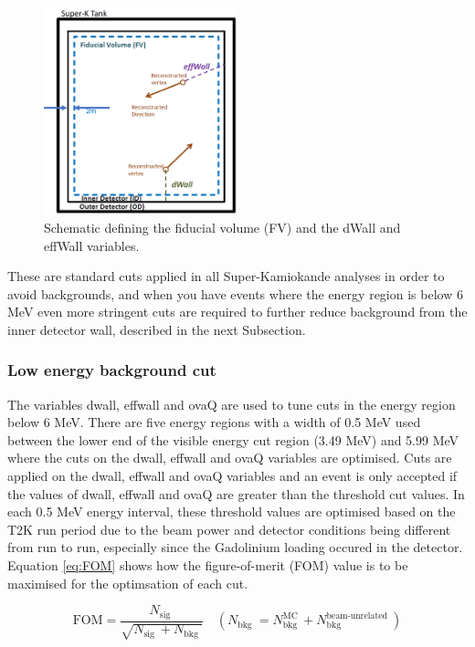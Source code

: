 \begin{figure}
    \centering 
    \includegraphics[width=0.5\textwidth]{Figures/fv_dwall_effwall.png}
    \caption{Schematic defining the fiducial volume (FV) and the dWall and effWall variables.}
    \label{fig:dwall_effwall_fv}
\end{figure} 
                                                                                        
These are standard cuts applied in all Super-Kamiokande analyses in order to avoid backgrounds, and when you have events where the energy region is below 6 MeV even more stringent cuts are required to further reduce background from the inner detector wall, described in the next Subsection. 

\subsubsection{Low energy background cut}

The variables dwall, effwall and ovaQ are used to tune cuts in the energy region below 6 MeV. There are five energy regions with a width of 0.5 MeV used between the lower end of the visible energy cut region (3.49 MeV) and 5.99 MeV where the cuts on the dwall, effwall and ovaQ variables are optimised. Cuts are applied on the dwall, effwall and ovaQ variables and an event is only accepted if the values of dwall, effwall and ovaQ are greater than the threshold cut values. In each 0.5 MeV energy interval, these threshold values are optimised based on the T2K run period due to the beam power and detector conditions being different from run to run, especially since the Gadolinium loading occured in the detector. Equation \ref{eq:FOM} shows how the figure-of-merit (FOM) value is to be maximised for the optimsation of each cut.

\begin{equation}
    \mathrm{FOM}=\frac{N_{\text {sig }}}{\sqrt{N_{\text {sig }}+N_{\text {bkg }}}} \quad\left(N_{\text {bkg }}=N_{\text {bkg }}^{\mathrm{MC}}+N_{\text {bkg }}^{\text {beam-unrelated }}\right)
\label{eq:FOM}
\end{equation}

